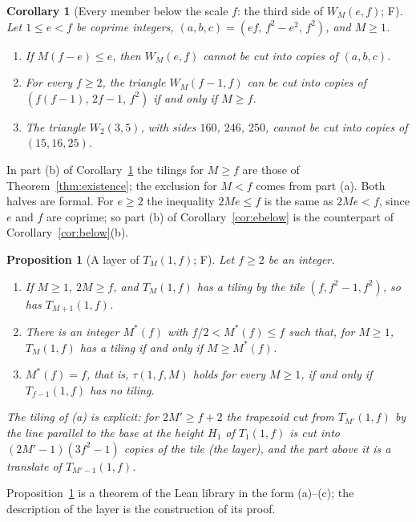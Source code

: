 \documentclass[11pt,reqno]{amsart}
\theoremstyle{plain}
\newtheorem{corollary}[theorem]{Corollary}
\newtheorem{proposition}[theorem]{Proposition}
\theoremstyle{definition}
\newcommand{\sF}{\textup{\textsf{F}}}
\begin{document}
\begin{corollary}[Every member below the scale $f$: the third side of $W_M(e,f)$; \sF]\label{cor:thickw}
Let $1\le e<f$ be coprime integers, $(a,b,c)=(ef,\,f^2-e^2,\,f^2)$, and $M\ge1$.
\begin{enumerate}
\item[\textup{(a)}] If $M(f-e)\le e$, then $W_M(e,f)$ cannot be cut into copies of $(a,b,c)$.
\item[\textup{(b)}] For every $f\ge2$, the triangle $W_M(f-1,f)$ can be cut into copies of
$(f(f-1),\,2f-1,\,f^2)$ if and only if $M\ge f$.
\item[\textup{(c)}] The triangle $W_2(3,5)$, with sides $160$, $246$, $250$, cannot be cut into copies of
$(15,16,25)$.
\end{enumerate}
\end{corollary}

In part \textup{(b)} of Corollary~\ref{cor:thickw} the tilings for $M\ge f$ are those of
Theorem~\ref{thm:existence}; the exclusion for $M<f$ comes from part \textup{(a)}. Both halves are formal.
For $e\ge2$ the inequality $2Me\le f$ is the same as $2Me<f$, since $e$ and $f$ are coprime; so part
\textup{(b)} of Corollary~\ref{cor:ebelow} is the counterpart of Corollary~\ref{cor:below}\textup{(b)}.

\begin{proposition}[A layer of $T_M(1,f)$; \sF]\label{prop:layer}
Let $f\ge2$ be an integer.
\begin{enumerate}
\item[\textup{(a)}] If $M\ge1$, $2M\ge f$, and $T_M(1,f)$ has a tiling by the tile $(f,f^2-1,f^2)$, so has
$T_{M+1}(1,f)$.
\item[\textup{(b)}] There is an integer $M^*(f)$ with $f/2<M^*(f)\le f$ such that, for $M\ge1$, $T_M(1,f)$ has a
tiling if and only if $M\ge M^*(f)$.
\item[\textup{(c)}] $M^*(f)=f$, that is, $\tau(1,f,M)$ holds for every $M\ge1$, if and only if $T_{f-1}(1,f)$ has
no tiling.
\end{enumerate}
The tiling of \textup{(a)} is explicit: for $2M'\ge f+2$ the trapezoid cut from $T_{M'}(1,f)$ by the line parallel
to the base at the height $H_1$ of $T_1(1,f)$ is cut into $(2M'-1)(3f^2-1)$ copies of the tile (the \emph{layer}),
and the part above it is a translate of $T_{M'-1}(1,f)$.
\end{proposition}

Proposition~\ref{prop:layer} is a theorem of the Lean library in the form \textup{(a)}--\textup{(c)}; the
description of the layer is the construction of its proof.
\end{document}
